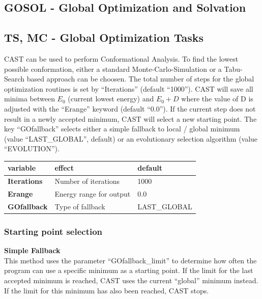 \documentclass[10pt,a4paper]{article} %
\newif\ifdevmode %
\begin{document}
	
	
	\fi
	
	\subsection{GOSOL - Global Optimization and Solvation}	
	\ifdevmode \colorbox{red}{write something here} \fi

	
	\subsection{TS, MC - Global Optimization Tasks}
	\ac{CAST} can be used to perform Conformational Analysis. To find the lowest possible conformation, either a standard Monte-Carlo-Simulation\supercite{mc_original, mmc_original} or a Tabu-Search\cite{tabusearch_original1, tabusearch_original2, tabusearch_original3} based approach can be choosen. The total number of steps for the global optimization routines is set by ``Iterations'' (default ``1000''). \ac{CAST} will save all minima between $E_0$ (current lowest energy) and $E_0 + D$ where the value of D is adjusted with the ``Erange'' keyword (default ``0.0'').
	If the current step does not result in a newly accepted minimum, \ac{CAST} will select a new starting point. The key ``GOfallback'' selects either a simple fallback to local / global minimum (value ``LAST\_GLOBAL'', default) or an evolutionary selection algorithm (value ``EVOLUTION'').
	
	\begin{tabularx}{\textwidth}{l|X|X}
	variable & effect & default \\
	\hline
	\textbf{Iterations} & Number of iterations & 1000 \\
	\textbf{Erange} & Energy range for output & 0.0 \\
		\textbf{GOfallback} & Type of fallback & LAST\_GLOBAL \\
	\end{tabularx}
	
	\subsubsection{Starting point selection}
	\textbf{Simple Fallback} \\
	This method uses the parameter ``GOfallback\_limit'' to determine how often the program can use a specific minimum as a starting point. If the limit for the last accepted minimum is reached, \ac{CAST} uses the current ``global'' minimum instead. If the limit for this minimum has also been reached, \ac{CAST} stops.\\~\\
		
\end{document}
